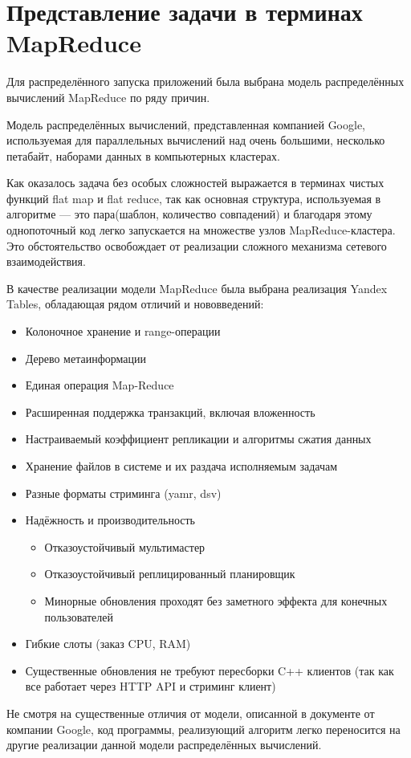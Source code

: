 \section{Представление задачи в терминах MapReduce}
Для распределённого запуска приложений была выбрана модель распределённых
вычислений MapReduce по ряду причин.
\begin{definition}[MapReduce]
  Модель распределённых вычислений, представленная
  компанией Google, используемая для параллельных вычислений над очень
  большими, несколько петабайт, наборами данных в компьютерных кластерах.
\end{definition}

Как оказалось задача без особых сложностей выражается в терминах
чистых функций flat map и flat reduce, так как основная структура,
используемая в алгоритме --- это пара(шаблон, количество совпадений)
и благодаря этому однопоточный код легко запускается
на множестве узлов MapReduce-кластера. Это обстоятельство освобождает
от реализации сложного механизма сетевого взаимодействия.

В качестве реализации модели MapReduce была выбрана реализация
Yandex Tables, обладающая рядом отличий и нововведений:
\begin{itemize}
  \item Колоночное хранение и range-операции
  \item Дерево метаинформации
  \item Единая операция Map-Reduce
  \item Расширенная поддержка транзакций, включая вложенность
  \item Настраиваемый коэффициент репликации и алгоритмы сжатия данных
  \item Хранение файлов в системе и их раздача исполняемым задачам
  \item Разные форматы стриминга (yamr, dsv)
  \item Надёжность и производительность
    \begin{itemize}
      \item Отказоустойчивый мультимастер
      \item Отказоустойчивый реплицированный планировщик
      \item Минорные обновления проходят без заметного эффекта для
        конечных пользователей
    \end{itemize}
  \item Гибкие слоты (заказ CPU, RAM)
  \item Существенные обновления не требуют пересборки C++ клиентов
    (так как все работает через HTTP API и стриминг клиент)
\end{itemize}
Не смотря на существенные отличия от модели, описанной в документе от компании
Google, код программы, реализующий алгоритм легко переносится
на другие реализации данной модели распределённых вычислений.


